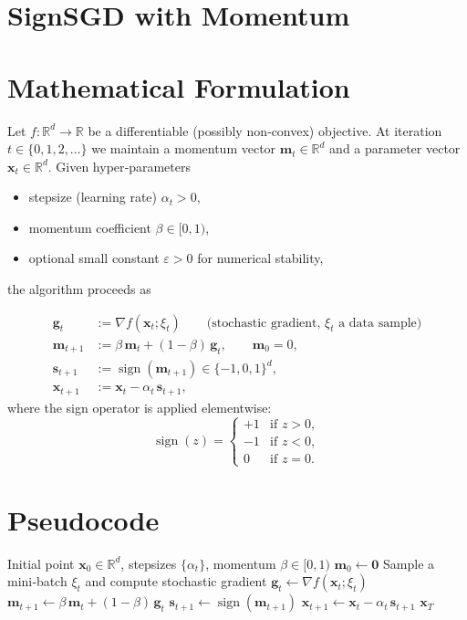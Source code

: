 \documentclass[11pt]{article}
\newcommand{\R}{\mathbb{R}}
\newcommand{\sign}{\operatorname{sign}}
\begin{document}
\section*{SignSGD with Momentum}

\section*{Mathematical Formulation}
Let $f:\R^{d}\to\R$ be a differentiable (possibly non‑convex) objective.  
At iteration $t\in\{0,1,2,\dots\}$ we maintain a momentum vector $\bm{m}_{t}\in\R^{d}$ and a parameter vector $\bm{x}_{t}\in\R^{d}$.  
Given hyper‑parameters  
\begin{itemize}[noitemsep]
    \item stepsize (learning rate) $\alpha_{t}>0$,
    \item momentum coefficient $\beta\in[0,1)$,
    \item optional small constant $\varepsilon>0$ for numerical stability,
\end{itemize}
the algorithm proceeds as  

\[
\begin{aligned}
    \bm{g}_{t} &:= \nabla f(\bm{x}_{t};\xi_{t}) \qquad\text{(stochastic gradient, $\xi_{t}$ a data sample)}\\[4pt]
    \bm{m}_{t+1} &:= \beta\,\bm{m}_{t} + (1-\beta)\,\bm{g}_{t}, \qquad \bm{m}_{0}=0,\\[4pt]
    \bm{s}_{t+1} &:= \sign(\bm{m}_{t+1})\in\{-1,0,1\}^{d},\\[4pt]
    \bm{x}_{t+1} &:= \bm{x}_{t} - \alpha_{t}\,\bm{s}_{t+1},
\end{aligned}
\tag{1}
\]
where the sign operator is applied elementwise:
\[
\sign(z)=\begin{cases}
+1 &\text{if }z>0,\\[2pt]
-1 &\text{if }z<0,\\[2pt]
0  &\text{if }z=0.
\end{cases}
\]

\section*{Pseudocode}
\begin{algorithm}[H]
\caption{SignSGD with Momentum}
\begin{algorithmic}[1]
\Require Initial point $\bm{x}_{0}\in\R^{d}$, stepsizes $\{\alpha_{t}\}$, momentum $\beta\in[0,1)$
\State $\bm{m}_{0}\gets\bm{0}$
    \State Sample a mini‑batch $\xi_{t}$ and compute stochastic gradient $\bm{g}_{t}\gets\nabla f(\bm{x}_{t};\xi_{t})$
    \State $\bm{m}_{t+1}\gets\beta\,\bm{m}_{t}+(1-\beta)\,\bm{g}_{t}$      
    \State $\bm{s}_{t+1}\gets\sign(\bm{m}_{t+1})$                         
    \State $\bm{x}_{t+1}\gets\bm{x}_{t}-\alpha_{t}\,\bm{s}_{t+1}$          
\EndFor
\State \Return $\bm{x}_{T}$
\end{algorithmic}
\end{algorithm}
\end{document}

